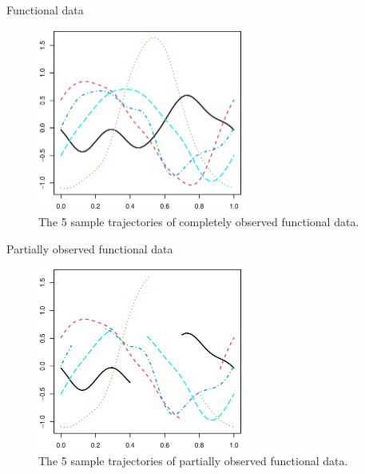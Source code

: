 \documentclass[9pt]{beamer}
\begin{document}
\begin{frame}[allowframebreaks]{Functional data}
	\begin{figure}[h]
		\centering
		\includegraphics[height=6cm,keepaspectratio=true]{img/funcional_obs.eps}
		\caption{The 5 sample trajectories of completely observed functional data.}
		\label{fig1}
	\end{figure}
\end{frame}

\begin{frame}[allowframebreaks]{Partially observed functional data}
	\begin{figure}[h]
		\centering
		\includegraphics[height=6cm,keepaspectratio=true]{img/partial_obs.eps}
		\caption{The 5 sample trajectories of partially observed functional data.}
		\label{fig2}
	\end{figure}
\end{frame}
\end{document}
